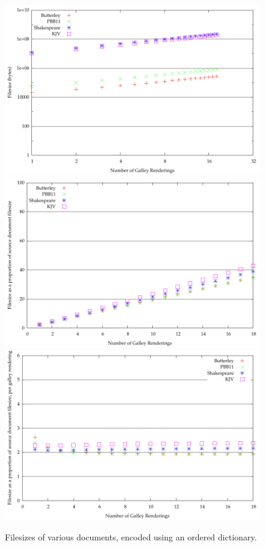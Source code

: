 \begin{figure}
  \begin{center}
  \includegraphics[width=\textwidth]{gnuplot/4-b}
  \includegraphics[width=\textwidth]{gnuplot/4-s}
  \includegraphics[width=\textwidth]{gnuplot/4-r}
  \end{center}
  \caption[Filesizes with an ordered dictionary]{Filesizes of various documents, encoded using an ordered dictionary.}
  \label{fig:size-ord}
\end{figure}



